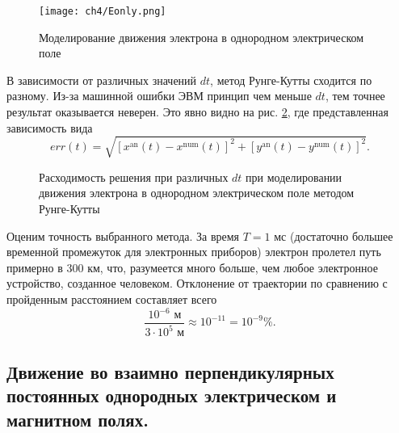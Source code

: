 \begin{figure}[h]
\centering
\texttt{[image: ch4/Eonly.png]}
\caption{Моделирование движения электрона в однородном электрическом поле}
\label{fig:Eonly}
\end{figure}

В зависимости от различных значений $dt$, метод Рунге-Кутты сходится по разному. Из-за машинной ошибки ЭВМ принцип чем меньше $dt$, тем точнее результат оказывается неверен. Это явно видно на рис. \ref{fig:errors}, где представленная зависимость вида 
\begin{equation*}
err(t) = \sqrt{ [x^{\text{an}}(t) - x^{\text{num}}(t) ]^2  + [y^{\text{an}}(t) - y^{\text{num}}(t)]^2 }.
\end{equation*}


\begin{figure}[h]
	\begin{minipage}[h]{.33\linewidth}
	\end{minipage}
	\hfill
	\begin{minipage}[h]{.33\linewidth}
	\end{minipage}
	\hfill
	\begin{minipage}[h]{.32\linewidth}
	\end{minipage}
	\caption{Расходимость решения при различных $dt$ при моделировании движения электрона в однородном электрическом поле методом Рунге-Кутты}
	\label{fig:errors}
\end{figure}

Оценим точность выбранного метода. За время $T = 1 \text{ мс}$ (достаточно большее временной промежуток для электронных приборов) электрон пролетел путь примерно в $300 \text{ км}$, что, разумеется много больше, чем любое электронное устройство, созданное человеком. Отклонение от траектории по сравнению с пройденным расстоянием составляет всего $$\dfrac{10^{-6} \text{ м}}{3\cdot10^5 \text{ м}} \approx 10^{-11} = 10^{-9} \%.$$

\subsection{Движение во взаимно перпендикулярных постоянных однородных электрическом и магнитном полях.}


